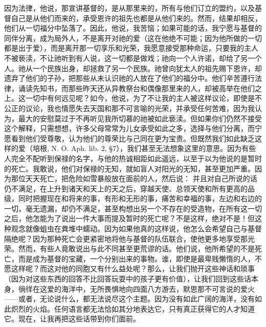 因为法律，他说，那宣讲基督的，是从那里来的，所有与他们订立的盟约，以及基督自己是从他们而来的，承受恩许的祖先也都是从他们来的。然而，结果却相反，他们从一切福分中坠落了。因此，他说，我苦恼；如果可能的话，我宁愿与基督的同伴分离，成为局外人，不是离开对祂的爱（这在他绝不可能；因为他所做的一切都是出于爱），而是离开那一切享乐和光荣，我愿意接受那种命运，只要我的主人不被亵渎，不让祂听到有人说，这一切都是做戏；祂向一个人许诺，却给了另一个人。祂从一个民族出身，却拯救了另一个民族。祂曾向犹太人的祖先赐下恩许，却遗弃了他们的子孙，把那些从未认识祂的人放在了他们的福分中。他们辛苦遵行法律，诵读先知书，而那些昨天还从异教祭台和偶像那里来的人，却被高举在他们之上。这一切中有何远见呢？如今，他说，为了不让我的主人被这样议论，即使是不公正的议论，我也情愿失去天国和那不可言喻的光荣，并承受任何苦难，因为我认为，最大的安慰莫过于不再听见我所切慕的祂被如此亵渎。但如果你们仍然不接受这个解释，只需想想，许多父母常常为儿女承受如此之多，选择与他们分离，而宁愿看到他们受尊敬，认为他们的尊荣比与己同在更为宝贵。但既然我们如此缺乏这样的爱（培根, N. O. Aph. lib. 2, §7），我们甚至无法想象这里的意思。因为有些人完全不配听到保禄的名字，与他的热诚相距如此遥远，以至于以为他说的是暂时的死亡。我敢说，他们对保禄的无知，就如盲人对阳光的无知，甚至更加严重。因为那位天天死亡，把危险如雪暴般放在面前的人，然后说： 并且对自己所说的话仍不满足，在上升到诸天和天上的天之后，穿越天使、总领天使和所有更高的品级，同时把握现在和将来的事，有形和无形的事，痛苦和幸福的事，左边和右边的一切，毫无遗漏，却仍不满足，甚至构想出另一个不存在的受造物，在所有这一切之后，他怎能为了说出一件大事而提及暂时的死亡呢？不是这样，绝对不是！但这种观念就像蛆虫在粪堆中蠕动。因为如果他真的这样说，他怎么会希望自己与基督隔绝呢？因为那种死亡会更紧密地将他与基督的队伍联合，使他更多地享受那光荣。然而，有些人竟敢说出与此不同甚至更荒谬的话。他们说，他所希望的不是死亡，而是成为基督的宝藏，一个分别出来的事物。谁，即使是最卑贱懒惰的人，不愿这样呢？而这对他的同胞又有什么益处呢？那么，让我们抛开这些神话和琐事（因为对这些东西的回答不比回答玩耍中的孩子更有价值），让我们回到这些话本身，徜徉在这爱的海洋中，无所畏惧地向四面八方游去，默思那不可言说的爱火——或者，无论说什么，都无法说尽这个主题。因为没有如此广阔的海洋，没有如此炽烈的火焰。任何语言都无法恰如其分地表达它，只有真正获得它的人才知道它。现在，让我再把这些话带到你们面前。\par


